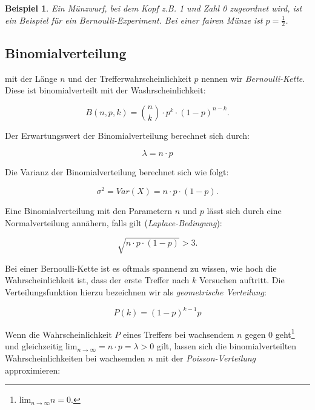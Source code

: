 \documentclass{tufte-handout}
\theoremstyle{own}
\newtheorem{example}{Beispiel}[]
\begin{document}
\begin{example}
	Ein Münzwurf, bei dem Kopf z.B. 1 und Zahl 0 zugeordnet wird, ist
	ein Beispiel für ein Bernoulli-Experiment. Bei einer fairen Münze ist 
	$p= \frac{1}{2}$.
\end{example}

\subsection{Binomialverteilung}

 mit der Länge $n$ und der Trefferwahrscheinlichkeit
$p$ nennen wir \textit{Bernoulli-Kette}. Diese ist binomialverteilt mit der 
Washrscheinlichkeit:

\begin{equation}
	B(n,p,k) = \binom{n}{k} \cdot p^k \cdot (1-p)^{n-k}.
\end{equation}

Der Erwartungswert der Binomialverteilung berechnet sich durch:

\begin{equation}
	\lambda = n \cdot p
\end{equation}

Die Varianz der Binomialverteilung berechnet sich wie folgt:

\begin{equation}
	\sigma^2 = Var(X) = n \cdot p \cdot (1-p).
\end{equation}

Eine Binomialverteilung mit den Parametern $n$ und $p$ lässt sich durch eine Normalverteilung annähern,
falls gilt (\textit{Laplace-Bedingung}): 

\begin{equation}
\sqrt{n \cdot p \cdot (1-p)} > 3.
\end{equation}

Bei einer Bernoulli-Kette ist es oftmals spannend zu wissen, wie hoch die
Wahrscheinlichkeit ist, dass der erste Treffer nach $k$ Versuchen auftritt.
Die Verteilungsfunktion hierzu bezeichnen wir als \textit{geometrische Verteilung}:

\begin{equation}
	P(k) = (1 - p)^{k-1} p
\end{equation}

Wenn die Wahrscheinlichkeit $P$ eines Treffers bei wachsendem $n$ gegen 0
geht\footnote{$\text{lim}_{n \rightarrow \infty} n = 0$.} und gleichzeitig
$\text{lim}_{n \rightarrow \infty} = n \cdot p = \lambda > 0$ gilt, lassen
sich die binomialverteilten Wahrscheinlichkeiten bei wachsemden $n$ mit der
\textit{Poisson-Verteilung} approximieren:
\end{document}
